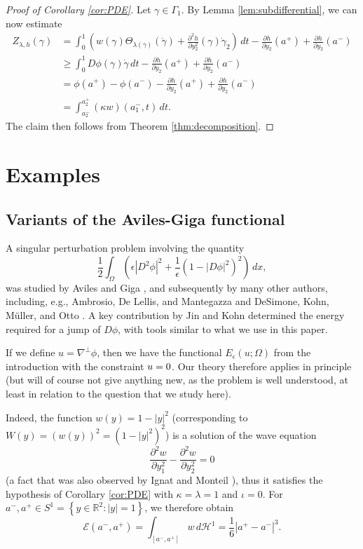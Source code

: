 \documentclass[a4paper]{article}
\newcommand{\R}{\mathbb{R}}
\newcommand{\Ha}{\mathcal{H}}
\let\div\relax\DeclareMathOperator{\div}{div}
\newcommand{\dd}[2]{\frac{\partial #1}{\partial #2}}
\newcommand{\set}[2]{\left\{ #1 \colon #2 \right\}}
\theoremstyle{definition}
\theoremstyle{remark}
\begin{document}
\begin{proof}[Proof of Corollary \ref{cor:PDE}]
Let $\gamma \in \Gamma_1$. By Lemma \ref{lem:subdifferential}, we can now estimate
\[
\begin{split}
Z_{\lambda, h}(\gamma) & = \int_0^1 \left(w(\gamma) \Theta_{\lambda(\gamma)}(\dot{\gamma}) + \frac{\partial^2 h}{\partial y_2^2}(\gamma) \dot{\gamma}_2\right) \, dt - \dd{h}{y_2}(a^+) + \dd{h}{y_2}(a^-) \\
& \ge \int_0^1 D\phi(\gamma) \dot{\gamma} \, dt - \dd{h}{y_2}(a^+) + \dd{h}{y_2}(a^-) \\
& = \phi(a^+) - \phi(a^-) - \dd{h}{y_2}(a^+) + \dd{h}{y_2}(a^-) \\
& = \int_{a_2^-}^{a_2^+} (\kappa w)(a_1^-, t) \, dt.
\end{split}
\]
The claim then follows from Theorem \ref{thm:decomposition}.
\end{proof}








\section{Examples} \label{sct:examples}

\subsection{Variants of the Aviles-Giga functional}

A singular perturbation problem involving the quantity
\[
\frac{1}{2} \int_\Omega \left(\epsilon |D^2 \phi|^2 + \frac{1}{\epsilon} (1 - |D\phi|^2)^2\right) \, dx,
\]
was studied by Aviles and Giga \cite{Aviles-Giga:87}, and subsequently by
many other authors, including, e.g., Ambrosio, De Lellis, and Mantegazza \cite{Ambrosio-DeLellis-Mantegazza:99}
and DeSimone, Kohn, M\"uller, and Otto \cite{DeSimone-Kohn-Mueller-Otto:01}. A key contribution by Jin and Kohn \cite{Jin-Kohn:00}
determined the energy required for a jump of $D\phi$, with tools similar
to what we use in this paper.

If we define $u = \nabla^\perp \phi$, then we have the functional $E_\epsilon(u; \Omega)$ from
the introduction with the constraint $\div u = 0$. Our theory therefore applies in principle
(but will of course not give anything new, as the problem is well understood, at least in relation
to the question that we study here).

Indeed, the function $w(y) = 1 - |y|^2$ (corresponding to $W(y) = (w(y))^2 = (1 - |y|^2)^2$) is
a solution of the wave equation
\[
\frac{\partial^2 w}{\partial y_1^2} - \frac{\partial^2 w}{\partial y_2^2} = 0
\]
(a fact that was also observed by Ignat and Monteil \cite{Ignat-Monteil:20}),
thus it satisfies the hypothesis of Corollary \ref{cor:PDE} with $\kappa = \lambda = 1$ and $\iota = 0$.
For $a^-, a^+ \in S^1 = \set{y \in \R^2}{|y| = 1}$, we therefore obtain
\[
\mathcal{E}(a^-, a^+) = \int_{[a^-, a^+]} w \, d\Ha^1 = \frac{1}{6} |a^+ - a^-|^3.
\]
\end{document}
